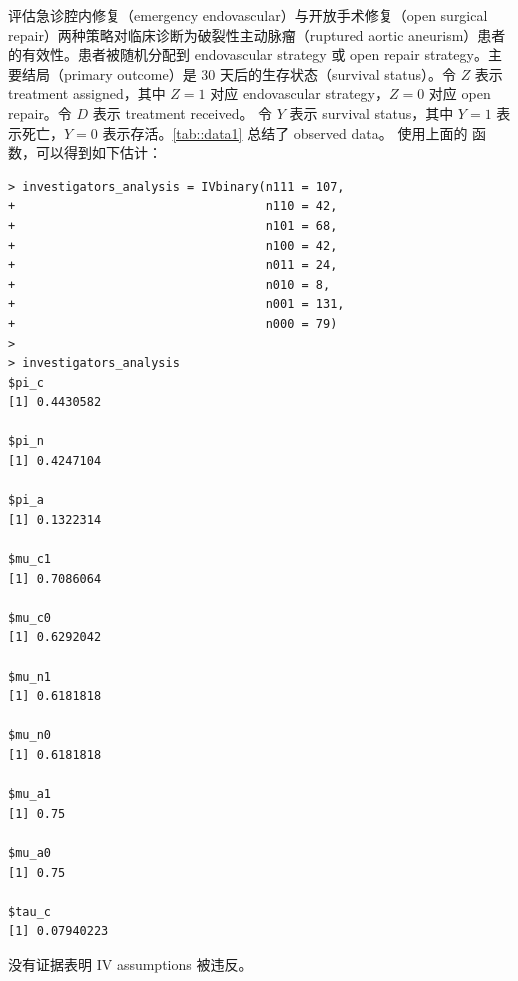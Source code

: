 \begin{example}\label{eg::1-iv-inequalities}
\citet{improve2014endovascular} 评估急诊腔内修复（emergency endovascular）与开放手术修复（open surgical repair）两种策略对临床诊断为破裂性主动脉瘤（ruptured aortic aneurism）患者的有效性。患者被随机分配到 endovascular strategy 或 open repair strategy。主要结局（primary outcome）是 30 天后的生存状态（survival status）。令 $Z$ 表示 treatment assigned，其中 $Z=1$ 对应 endovascular strategy，$Z=0$ 对应 open repair。令 $D$ 表示 treatment received。
令 $Y$ 表示 survival status，其中 $Y=1$ 表示死亡，$Y=0$ 表示存活。\cref{tab::data1} 总结了 observed data。
使用上面的  函数，可以得到如下估计：
\begin{lstlisting}
> investigators_analysis = IVbinary(n111 = 107,
+                                   n110 = 42,
+                                   n101 = 68,
+                                   n100 = 42,
+                                   n011 = 24,
+                                   n010 = 8,
+                                   n001 = 131,
+                                   n000 = 79)
>                         
> investigators_analysis
$pi_c
[1] 0.4430582

$pi_n
[1] 0.4247104

$pi_a
[1] 0.1322314

$mu_c1
[1] 0.7086064

$mu_c0
[1] 0.6292042

$mu_n1
[1] 0.6181818

$mu_n0
[1] 0.6181818

$mu_a1
[1] 0.75

$mu_a0
[1] 0.75

$tau_c
[1] 0.07940223
\end{lstlisting}
没有证据表明 IV assumptions 被违反。
\end{example}


